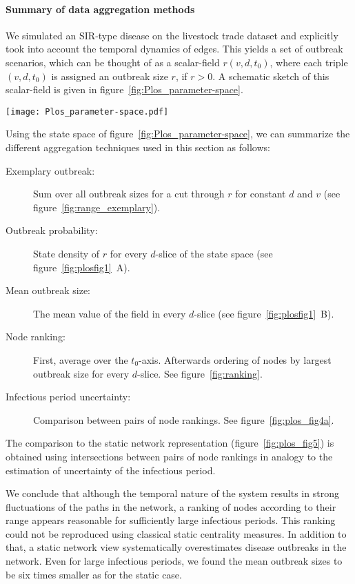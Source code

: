 \paragraph{Summary of data aggregation methods\color{Cayenne}{.}}
We simulated an SIR-type disease on the livestock trade dataset and explicitly took into account the temporal dynamics of edges.
This yields a set of outbreak scenarios, which can be thought of as a scalar-field $r(v,d,t_0)$, where each triple $(v,d,t_0)$ is assigned an outbreak size $r$, if $r>0$.
A schematic sketch of this scalar-field is given in figure~\ref{fig:Plos_parameter-space}.
%
\begin{SCfigure}
\texttt{[image: Plos\_parameter-space.pdf]}
\caption{Scalar field representing the set of outbreak scenarios as defined in \eqref{eq:outbreak_set}.
Each combination of starting node $v$, starting time $t_0$ and infectious period $d$ yields an outbreak size $r(v,d,t_0)$.
The domain is bounded as defined in \eqref{eq:outbreak_set}.}
\label{fig:Plos_parameter-space}
\end{SCfigure}
%
Using the state space of figure~\ref{fig:Plos_parameter-space}, we can summarize the different aggregation techniques used in this section as follows:
\begin{description}
\item [Exemplary outbreak:] Sum over all outbreak sizes for a cut through $r$ for constant $d$ and $v$ (see figure~\ref{fig:range_exemplary}).
\item [Outbreak probability:] State density of $r$ for every $d$-slice of the state space (see figure~\ref{fig:plosfig1}~A).
\item [Mean outbreak size:] The mean value of the field in every $d$-slice (see figure~\ref{fig:plosfig1}~B).
\item [Node ranking:] First, average over the $t_0$-axis. Afterwards ordering of nodes by largest outbreak size for every $d$-slice. See figure~\ref{fig:ranking}.
\item [Infectious period uncertainty:] Comparison between pairs of node rankings. See figure~\ref{fig:plos_fig4a}.
\end{description}
%
The comparison to the static network representation (figure~\ref{fig:plos_fig5}) is obtained using intersections between pairs of node rankings in analogy to the estimation of uncertainty of the infectious period.

We conclude that although the temporal nature of the system results in strong fluctuations of the paths in the network, a ranking of nodes according to their range appears reasonable for sufficiently large infectious periods.
This ranking could not be reproduced using classical static centrality measures.
In addition to that, a static network view systematically overestimates disease outbreaks in the network.
Even for large infectious periods, we found the mean outbreak sizes to be six times smaller as for the static case.

